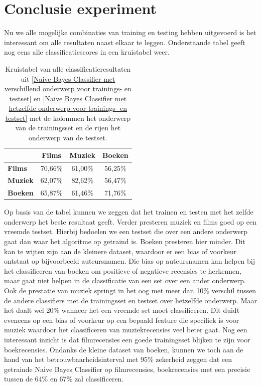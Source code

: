 \section{Conclusie experiment}\label{Conclusie experiment}

Nu we alle mogelijke combinaties van training en testing hebben uitgevoerd is het interessant om alle resultaten naast elkaar te leggen. Onderstaande tabel geeft nog eens alle classificatiescores in een kruistabel weer.

\begin{table}[h]
\centering
\begin{tabular}{l|c|c|c|}
\cline{2-4}
                                      & \textbf{Films} & \textbf{Muziek} & \textbf{Boeken} \\ \hline
\multicolumn{1}{|l|}{\textbf{Films}} & 70,66\%         & 61,00\%         & 56,25\%         \\ \hline
\multicolumn{1}{|l|}{\textbf{Muziek}} & 62,07\%         & 82,62\%         & 56,47\%         \\ \hline
\multicolumn{1}{|l|}{\textbf{Boeken}} & 65,87\%         & 61,46\%         & 71,76\%         \\ \hline
\end{tabular}
\label{tab:alles}
\caption{Kruistabel van alle classificatieresultaten uit \ref{Naive Bayes Classifier met verschillend onderwerp voor trainings- en testset} en \ref{Naive Bayes Classifier met hetzelfde onderwerp voor trainings- en testset} met de kolommen het onderwerp van de trainingsset en de rijen het onderwerp van de testset.} 
\end{table}


Op basis van de tabel kunnen we zeggen dat het trainen en testen met het zelfde onderwerp het beste resultaat geeft. Verder presteren muziek en films goed op een vreemde testset. Hierbij bedoelen we een testset die over een andere onderwerp gaat dan waar het algoritme op getraind is.  Boeken presteren hier minder. Dit kan te wijten zijn aan de kleinere dataset, waardoor er een bias of voorkeur ontstaat op bijvoorbeeld auteursnamen. Die bias op auteursnamen kan helpen bij het classificeren van boeken om positieve of negatieve recensies te herkennen, maar gaat niet helpen in de classificatie van een set over een ander onderwerp. Ook de prestatie van muziek springt in het oog met meer dan 10\% verschil tussen de andere classifiers met de trainingsset en testset over hetzelfde onderwerp. Maar het daalt wel 20\% wanneer het een vreemde set moet classificeren. Dit duidt eveneens op een bias of voorkeur op een bepaald feature die specifiek is voor muziek waardoor het classificeren van muziekrecensies veel beter gaat. Nog een interessant inzicht is dat filmrecensies een goede trainingsset blijken te zijn voor boekrecensies.  Ondanks de kleine dataset van boeken, kunnen we toch aan de hand van het betrouwbaarheidsinterval met 95\% zekerheid zeggen dat een getrainde Naive Bayes Classifier op filmrecensies, boekrecensies met een precisie tussen de 64\% en 67\% zal classificeren.\\

